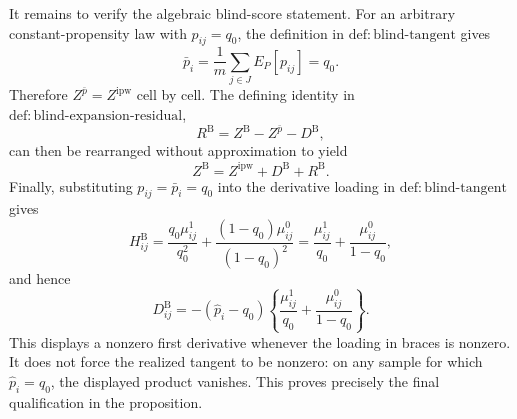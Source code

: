 It remains to verify the algebraic blind-score statement.  For an arbitrary constant-propensity law with \(p_{ij}=q_0\), the definition in \(\mathrm{def:blind\mbox{-}tangent}\) gives
\[
 \bar p_i=\frac1m\sum_{j\in J}E_P[p_{ij}]=q_0.
\]
Therefore \(Z^{\bar p}=Z^{\mathrm{ipw}}\) cell by cell.  The defining identity in \(\mathrm{def:blind\mbox{-}expansion\mbox{-}residual}\),
\[
 R^{\mathrm B}=Z^{\mathrm B}-Z^{\bar p}-D^{\mathrm B},
\]
can then be rearranged without approximation to yield
\[
 Z^{\mathrm B}=Z^{\mathrm{ipw}}+D^{\mathrm B}+R^{\mathrm B}.
\]
Finally, substituting \(p_{ij}=\bar p_i=q_0\) into the derivative loading in \(\mathrm{def:blind\mbox{-}tangent}\) gives
\[
 H^{\mathrm B}_{ij}
 =\frac{q_0\mu^1_{ij}}{q_0^2}
  +\frac{(1-q_0)\mu^0_{ij}}{(1-q_0)^2}
 =\frac{\mu^1_{ij}}{q_0}+\frac{\mu^0_{ij}}{1-q_0},
\]
and hence
\[
 D^{\mathrm B}_{ij}
 =-(\widehat p_i-q_0)
 \left\{\frac{\mu^1_{ij}}{q_0}+\frac{\mu^0_{ij}}{1-q_0}\right\}.
\]
This displays a nonzero first derivative whenever the loading in braces is nonzero.  It does not force the realized tangent to be nonzero: on any sample for which \(\widehat p_i=q_0\), the displayed product vanishes.  This proves precisely the final qualification in the proposition.

